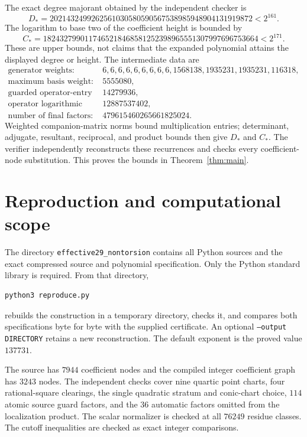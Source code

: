 \documentclass[11pt,a4paper]{article}
\begin{document}
The exact degree majorant obtained by the independent checker is
\[
 D_* =2021432499262561030580590567538985948904131919872
       <2^{161}.
\]
The logarithm to base two of the coefficient height is bounded by
\[
 C_* =1824327990117465218468581252398965551307997696753664
       <2^{171}.
\]
These are upper bounds, not claims that the expanded polynomial
attains the displayed degree or height. The intermediate data are
\[
 \begin{aligned}
 \text{generator weights: }&
 6,6,6,6,6,6,6,6,6,1568138,1935231,1935231,116318,\\
 \text{maximum basis weight: }&5555080,\\
 \text{guarded operator-entry degree: }&14279936,\\
 \text{operator logarithmic norm bound: }&12887537402,\\
 \text{number of final factors: }&479615460265661825024.
 \end{aligned}
\]
Weighted companion-matrix norms bound multiplication entries;
determinant, adjugate, resultant, reciprocal, and product bounds
then give $D_*$ and $C_*$. The verifier independently reconstructs
these recurrences and checks every coefficient-node substitution.
This proves the bounds in Theorem~\ref{thm:main}.

\section{Reproduction and computational scope}

The directory \texttt{effective29\_nontorsion} contains all Python sources
and the exact compressed source and polynomial specification.
Only the Python standard library is required. From that directory,
\begin{verbatim}
python3 reproduce.py
\end{verbatim}
rebuilds the construction in a temporary directory, checks it,
and compares both specifications byte for byte with the supplied
certificate. An optional \texttt{--output DIRECTORY} retains a
new reconstruction. The default exponent is the proved value
$137731$.

The source has $7944$ coefficient nodes and the compiled
integer coefficient graph has $3243$ nodes. The independent
checks cover nine quartic point charts, four rational-square
clearings, the single quadratic stratum and conic-chart choice,
$114$ atomic source guard factors, and the
$36$ automatic factors omitted from the localization product.
The scalar normalizer is checked at all $76249$ residue classes.
The cutoff inequalities are checked as exact integer comparisons.
\end{document}
